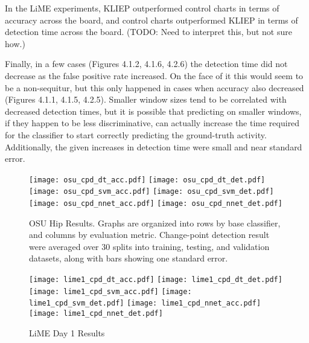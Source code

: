 In the LiME experiments, KLIEP outperformed control charts in terms of
accuracy across the board, and control charts outperformed KLIEP in terms of
detection time across the board. (TODO: Need to interpret this, but not sure
how.)

Finally, in a few cases (Figures 4.1.2, 4.1.6, 4.2.6) the detection time did
not decrease as the false positive rate increased. On the face of it this would seem
to be a non-sequitur, but this only happened in cases when accuracy also decreased
(Figures 4.1.1, 4.1.5, 4.2.5).
Smaller window sizes tend to be correlated with decreased detection times, but
it is possible that predicting on smaller windows, if they happen to be less discriminative,
can actually increase the time required for the classifier to start correctly
predicting the ground-truth activity. Additionally, the given increases in detection
time were small and near standard error.

%

\begin{figure}[H]
 \texttt{[image: osu\_cpd\_dt\_acc.pdf]} \hspace{1em}\vspace{1em}
 \texttt{[image: osu\_cpd\_dt\_det.pdf]}
 \texttt{[image: osu\_cpd\_svm\_acc.pdf]} \hspace{1em}\vspace{1em}
 \texttt{[image: osu\_cpd\_svm\_det.pdf]}
 \texttt{[image: osu\_cpd\_nnet\_acc.pdf]} \hspace{2em}
 \texttt{[image: osu\_cpd\_nnet\_det.pdf]}
 \caption{OSU Hip Results. Graphs are organized into rows by base classifier,
  and columns by evaluation metric. Change-point detection result were averaged over
  30 splits into training, testing, and validation datasets,
  along with bars showing one standard error.}
 \label{fig:osu_cpd}
\end{figure}

\begin{figure}[H]
 \centering
 \texttt{[image: lime1\_cpd\_dt\_acc.pdf]} \hspace{1em}\vspace{1em}
 \texttt{[image: lime1\_cpd\_dt\_det.pdf]}
 \texttt{[image: lime1\_cpd\_svm\_acc.pdf]} \hspace{1em}\vspace{1em}
 \texttt{[image: lime1\_cpd\_svm\_det.pdf]}
 \texttt{[image: lime1\_cpd\_nnet\_acc.pdf]} \hspace{1em}
 \texttt{[image: lime1\_cpd\_nnet\_det.pdf]}
 \caption{LiME Day 1 Results}
 \label{fig:lime1_cpd}
\end{figure}

